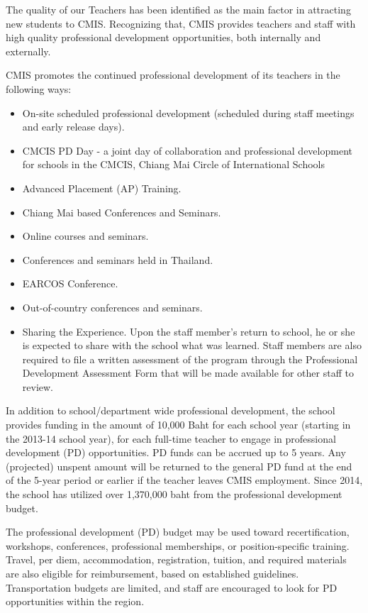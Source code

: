 The quality of our Teachers has been identified as the main factor in attracting new students to CMIS.  Recognizing that, CMIS provides teachers and staff with high quality professional development opportunities, both internally and externally.  

CMIS promotes the continued professional development of its teachers in the following ways:

\begin{itemize}
\item On-site scheduled professional development (scheduled during staff meetings and early release days).
\item CMCIS  PD Day - a joint day of collaboration and professional development for schools in the CMCIS, Chiang Mai Circle of International Schools
\item Advanced Placement (AP) Training.  
\item Chiang Mai based Conferences and Seminars. 
\item Online courses and seminars.  
\item Conferences and seminars held in Thailand. 
\item EARCOS Conference.
\item  Out-of-country conferences and seminars. 
\item Sharing the Experience.  Upon the staff member’s return to school, he or she is expected to share with the school what was learned.  Staff members are also required to file a written assessment of the program through the Professional Development Assessment Form that will be made available for other staff to review.
\end{itemize}



In addition to school/department wide professional development, the school provides funding in the amount of 10,000 Baht for each school year (starting in the 2013-14 school year), for each full-time teacher to engage in professional development (PD) opportunities.  PD funds can be accrued up to 5 years. Any (projected) unspent amount will be returned to the general PD fund at the end of the 5-year period or earlier if the teacher leaves CMIS employment. Since 2014, the school has utilized over 1,370,000 baht from the professional development budget.

The professional development (PD) budget may be used toward recertification, workshops, conferences, professional memberships, or position-specific training.  Travel, per diem, accommodation, registration, tuition, and required materials are also eligible for reimbursement, based on established guidelines.  Transportation budgets are limited, and staff are encouraged to look for PD opportunities within the region.  

